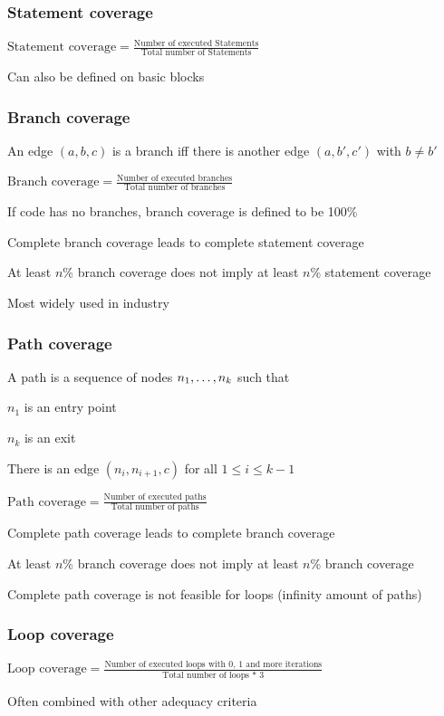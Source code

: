 \subsubsection{Statement coverage}
\enumstart
	\item $\text{Statement coverage} = \frac{\text{Number of executed Statements}}{\text{Total number of Statements}}$
	\item Can also be defined on basic blocks
\enumend

\subsubsection{Branch coverage}
\enumstart
	\item An edge $(a,b,c)$ is a branch iff there is another edge $(a,b',c')$ with $b \ne b'$
	\item $\text{Branch coverage} = \frac{\text{Number of executed branches}}{\text{Total number of branches}}$
	\item If code has no branches, branch coverage is defined to be 100\%
	\item Complete branch coverage leads to complete statement coverage
	\item At least $n$\% branch coverage does not imply at least $n$\% statement coverage
	\item Most widely used in industry
\enumend

\subsubsection{Path coverage}
\enumstart
	\item A path is a sequence of nodes $n_1, \mathellipsis, n_k$ such that
	\enumstart
		\item $n_1$ is an entry point
		\item $n_k$ is an exit
		\item There is an edge $(n_i, n_{i+1}, c)$ for all $1 \le i \le k-1$
	\enumend
	\item $\text{Path coverage} = \frac{\text{Number of executed paths}}{\text{Total number of paths}}$
	\item Complete path coverage leads to complete branch coverage
	\item At least $n$\% branch coverage does not imply at least $n$\% branch coverage
	\item Complete path coverage is not feasible for loops (infinity amount of paths)
\enumend

\subsubsection{Loop coverage}
\enumstart
	\item $\text{Loop coverage} = \frac{\text{Number of executed loops with 0, 1 and more iterations}}{\text{Total number of loops * 3}}$
	\item Often combined with other adequacy criteria
\enumend

